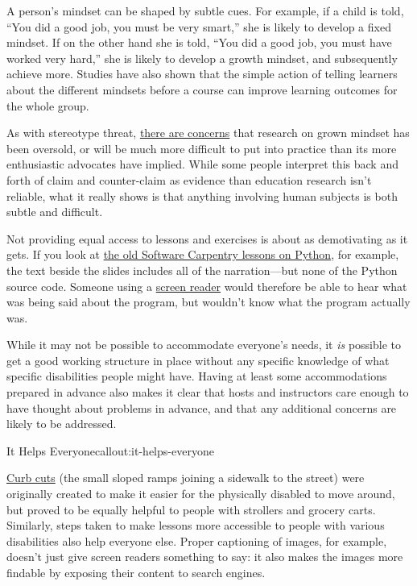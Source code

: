 A person's mindset can be shaped by subtle cues. For example, if a
child is told, ``You did a good job, you must be very smart,'' she is
likely to develop a fixed mindset. If on the other hand she is told,
``You did a good job, you must have worked very hard,'' she is likely
to develop a growth mindset, and subsequently achieve more. Studies
have also shown that the simple action of telling learners about the
different mindsets before a course can improve learning outcomes for
the whole group.

As with stereotype threat,
\href{http://www.learningspy.co.uk/psychology/growth-mindset-bollocks/}{there
are concerns} that research on grown mindset has been oversold, or
will be much more difficult to put into practice than its more
enthusiastic advocates have implied.  While some people interpret this
back and forth of claim and counter-claim as evidence than education
research isn't reliable, what it really shows is that anything
involving human subjects is both subtle and difficult.


Not providing equal access to lessons and exercises is about as
demotivating as it gets. If you look at
\href{http://swcarpentry.github.io/v4/python/flow.html}{the old
Software Carpentry lessons on Python}, for example, the text beside
the slides includes all of the narration---but none of the Python
source code.  Someone using a
\href{https://en.wikipedia.org/wiki/Screen\_reader}{screen reader} would
therefore be able to hear what was being said about the program, but
wouldn't know what the program actually was.

While it may not be possible to accommodate everyone's needs, it
\emph{is} possible to get a good working structure in place without any
specific knowledge of what specific disabilities people might have.
Having at least some accommodations prepared in advance also makes it
clear that hosts and instructors care enough to have thought about
problems in advance, and that any additional concerns are likely to be
addressed.

\begin{callout}{It Helps Everyone}{callout:it-helps-everyone}

\href{https://en.wikipedia.org/wiki/Curb\_cut}{Curb cuts} (the small
sloped ramps joining a sidewalk to the street) were originally created
to make it easier for the physically disabled to move around, but proved
to be equally helpful to people with strollers and grocery carts.
Similarly, steps taken to make lessons more accessible to people with
various disabilities also help everyone else. Proper captioning of
images, for example, doesn't just give screen readers something to say:
it also makes the images more findable by exposing their content to
search engines.

\end{callout}

